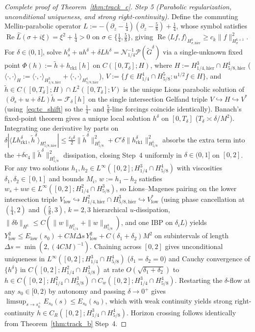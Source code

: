 \documentclass[11pt,a4paper]{article}
\begin{document}
\begin{proof}[Complete proof of Theorem~\ref{thm:track_c}]
\emph{Step 5 (Parabolic regularization, unconditional uniqueness, and strong right-continuity).}
Define the commuting Mellin-parabolic operator $L:=-(\partial_z-\tfrac14)(\partial_z-\tfrac58)+\tfrac14$, whose symbol satisfies $\operatorname{Re}\widehat L(\sigma+i\xi)=\xi^2+\tfrac14>0$ on $\sigma\in\{\tfrac14,\tfrac58\}$, giving $\operatorname{Re}\langle Lf,f\rangle_{H^k_{\sigma,\mathrm{hier}}}\ge c_k\|f\|_{H^{k+1}_\sigma}^2$.
For $\delta\in(0,1]$, solve $h^\delta_s+u h^\delta+\delta L h^\delta=\mathcal{N}_{1/4}^{-1}\mathcal{P}(\widetilde G^\delta)$ via a single-unknown fixed point $\Phi(h):=\tilde h+h_{\mathrm{rk1}}[h]$ on $C([0,T_\delta];H)$, where $H:=H^3_{1/4,\mathrm{hier}}\cap H^4_{5/8,\mathrm{hier}}$ ($\langle\cdot,\cdot\rangle_H:=\langle\cdot,\cdot\rangle_{H^3_{1/4,\mathrm{hier}}}+\langle\cdot,\cdot\rangle_{H^4_{5/8,\mathrm{hier}}}$), $V:=\{f\in H^4_{1/4}\cap H^5_{5/8} : u^{1/2}f\in H\}$, and $\tilde h\in C([0,T_\delta];H)\cap L^2([0,T_\delta];V)$ is the unique Lions parabolic solution of $(\partial_s+u+\delta L)\tilde h=\mathcal{F}_\delta[h]$ on the single intersection Gelfand triple $V\hookrightarrow H\hookrightarrow V^*$ (using~\eqref{eq:tc_shift} so the $\tfrac14$- and $\tfrac58$-line forcings coincide identically).  Banach's fixed-point theorem gives a unique local solution $h^\delta$ on $[0,T_\delta]$ ($T_\delta\asymp\delta/M^2$).  Integrating one derivative by parts on $\delta|\langle L h_{\mathrm{rk1}}^\delta,\tilde h^\delta\rangle_{H^4_{5/8,\mathrm{hier}}}|\le\tfrac{c_4\delta}{2}\|\tilde h^\delta\|_{H^5_{5/8}}^2+C'\delta\|h_{\mathrm{rk1}}^\delta\|_{H^5_{5/8}}^2$ absorbs the extra term into the $+\delta c_4\|\tilde h^\delta\|_{H^5_{5/8}}^2$ dissipation, closing Step~4 uniformly in $\delta\in(0,1]$ on $[0,2]$.
For any two solutions $h_1,h_2\in L^\infty([0,2];H^3_{1/4}\cap H^4_{5/8})$ with viscosities $\delta_1,\delta_2\in[0,1]$ and bounds $M_i$, $w:=h_1-h_2$ satisfies $w_s+u w\in L^\infty([0,2];H^2_{1/4}\cap H^3_{5/8})$, so Lions--Magenes pairing on the lower intersection triple $V_{\mathrm{low}}\hookrightarrow H^2_{1/4,\mathrm{hier}}\cap H^3_{5/8,\mathrm{hier}}\hookrightarrow V_{\mathrm{low}}^*$ (using phase cancellation at $(\tfrac14,2)$ and $(\tfrac58,3)$, $k=2,3$ hierarchical $u$-dissipation, $\|\delta b\|_{H^1}\le C(\|w\|_{H^2_{1/4}}+\|w\|_{H^3_{5/8}})$, and one IBP on $\delta_i L$) yields $Y_{\mathrm{low}}^2\le E_{\mathrm{low}}(s_0)+C M\Delta s\,Y_{\mathrm{low}}^2+C(\delta_1+\delta_2)M^2$ on subintervals of length $\Delta s=\min(2,(4CM)^{-1})$.
Chaining across $[0,2]$ gives unconditional uniqueness in $L^\infty([0,2];H^3_{1/4}\cap H^4_{5/8})$ ($\delta_1=\delta_2=0$) and Cauchy convergence of $\{h^\delta\}$ in $C([0,2];H^2_{1/4}\cap H^3_{5/8})$ at rate $O(\sqrt{\delta_1+\delta_2})$ to $h\in C([0,2];H^2_{1/4}\cap H^3_{5/8})\cap C_w([0,2];H^3_{1/4}\cap H^4_{5/8})$.  Restarting the $\delta$-flow at any $s_0\in[0,2)$ by autonomy and passing $\delta\to 0^+$ gives $\limsup_{s\to s_0^+}E_{s_0}(s)\le E_{s_0}(s_0)$, which with weak continuity yields strong right-continuity $h\in C_R([0,2];H^3_{1/4}\cap H^4_{5/8})$.  Horizon crossing follows identically from Theorem~\ref{thm:track_b} Step~4.
\end{proof}
\end{document}
